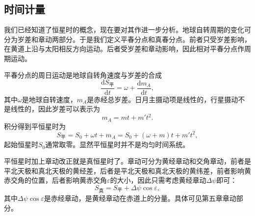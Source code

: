 \documentclass[11pt, a4paper, oneside]{ctexart}
\numberwithin{equation}{subsection}
\begin{document}
\subsection{时间计量}
我们已经知道了恒星时的概念，现在要对其作进一步分析。地球自转周期的变化可分为岁差和章动两部分。于是我们定义平春分点和真春分点。前者只受岁差影响，在黄道上沿与太阳相反方向运动。后者受岁差和章动影响，因此相对平春分点作周期运动。

平春分点的周日运动是地球自转角速度与岁差的合成
\begin{equation}
\frac{\mathrm{d}S_\text{平}}{\mathrm{d}t}=\omega+\frac{\mathrm{d}m_A}{\mathrm{d}t},
\end{equation}
其中$\omega$是地球自转速度，$m_A$是赤经总岁差。日月主摄动项是线性的，行星摄动不是线性的，因此岁差可以表示为
\begin{equation}
m_A=mt+m't^2.
\end{equation}
积分得到平恒星时为
\begin{equation}
S_\text{平}=S_0+\omega t+m_A=S_0+\left(\omega+m\right)t+m't^2,
\end{equation}
起始恒星时$S_0$通常取零。显然平恒星时并不是均匀时间系统。

平恒星时加上章动改正就是真恒星时了。章动可分为黄经章动和交角章动，前者是平北天极和真北天极的黄经差，后者是平北天极和真北天极的黄纬差，前者影响黄赤交角的位置，后者影响黄赤交角$\varepsilon$的大小，因此只需考虑黄经章动$\Delta{}\psi$即可：
\begin{equation}
S_\text{真}=S_\text{平}+\Delta\psi\cos\varepsilon,
\end{equation}
其中$\Delta\psi\cos\varepsilon$是赤经章动，是黄经章动在赤道上的分量。具体可见第五章章动部分。
\end{document}
